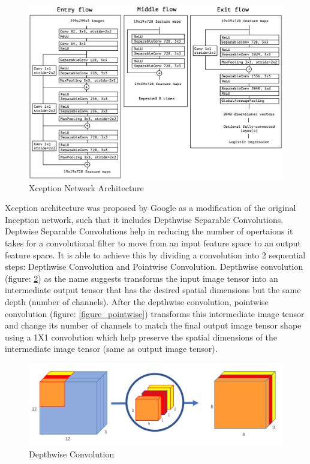 \documentclass{article}
\begin{document}
\begin{figure}[ht]
\vskip 0.2in
\begin{center}
\centerline{\includegraphics[width=\columnwidth]{figs/xception.png}}
\caption{Xception Network Architecture}
\label{figure_xception}
\end{center}
\vskip -0.2in
\end{figure}

Xception architecture was proposed by Google as a modification of the original Inception network, such that it includes Depthwise Separable Convolutions. Deptwise Separable Convolutions help in reducing the number of opertaions it takes for a convolutional filter to move from an input feature space to an output feature space. It is able to achieve this by dividing a convolution into 2 sequential steps: Depthwise Convolution and Pointwise Convolution. Depthwise convolution (figure: \ref{figure_depthwise}) as the name suggests transforms the input image tensor into an intermediate output tensor that has the desired spatial dimensions but the same depth (number of channels). After the depthwise convolution, pointwise convolution (figure: \ref{figure_pointwise}) transforms this intermediate image tensor and change its number of channels to match the final output image tensor shape using a 1X1 convolution which help preserve the spatial dimensions of the intermediate image tensor (same as output image tensor).

\begin{figure}[ht]
\vskip 0.2in
\begin{center}
\centerline{\includegraphics[width=\columnwidth]{figs/depthwise.png}}
\caption{Depthwise Convolution}
\label{figure_depthwise}
\end{center}
\vskip -0.2in
\end{figure}
\end{document}
